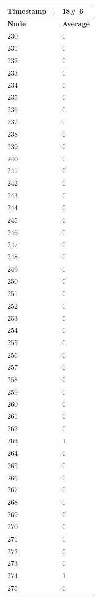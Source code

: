 \begin{tabular}{|l||l|}
\hline
\textbf{Timestamp =} & \textbf{18}\# 6\\\hline
	\textbf{Node} & \textbf{Average} \\ \hline
\hline
	230 & 0 \\ \hline
	231 & 0 \\ \hline
	232 & 0 \\ \hline
	233 & 0 \\ \hline
	234 & 0 \\ \hline
	235 & 0 \\ \hline
	236 & 0 \\ \hline
	237 & 0 \\ \hline
	238 & 0 \\ \hline
	239 & 0 \\ \hline
	240 & 0 \\ \hline
	241 & 0 \\ \hline
	242 & 0 \\ \hline
	243 & 0 \\ \hline
	244 & 0 \\ \hline
	245 & 0 \\ \hline
	246 & 0 \\ \hline
	247 & 0 \\ \hline
	248 & 0 \\ \hline
	249 & 0 \\ \hline
	250 & 0 \\ \hline
	251 & 0 \\ \hline
	252 & 0 \\ \hline
	253 & 0 \\ \hline
	254 & 0 \\ \hline
	255 & 0 \\ \hline
	256 & 0 \\ \hline
	257 & 0 \\ \hline
	258 & 0 \\ \hline
	259 & 0 \\ \hline
	260 & 0 \\ \hline
	261 & 0 \\ \hline
	262 & 0 \\ \hline
	263 & 1 \\ \hline
	264 & 0 \\ \hline
	265 & 0 \\ \hline
	266 & 0 \\ \hline
	267 & 0 \\ \hline
	268 & 0 \\ \hline
	269 & 0 \\ \hline
	270 & 0 \\ \hline
	271 & 0 \\ \hline
	272 & 0 \\ \hline
	273 & 0 \\ \hline
	274 & 1 \\ \hline
	275 & 0 \\ \hline
\end{tabular}

